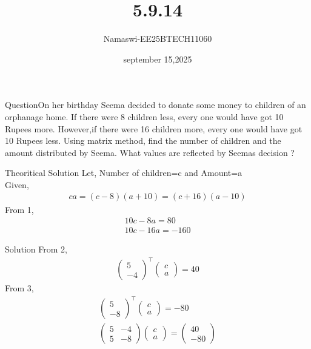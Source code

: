 \documentclass{beamer}
\begin{document}
\title 
{5.9.14}
\date{september 15,2025}


\author 
{Namaswi-EE25BTECH11060}
\frame{\titlepage}
\begin{frame}{Question}On her birthday Seema decided to donate some money to children of an orphanage home. If there were 8 children less, every one would have got  10 Rupees more. However,if there were 16 children more, every one would have got  10 Rupees less. Using matrix method, find the number of children and the amount distributed by Seema. What values are reflected by Seemas decision ?
\end{frame}
\begin{frame}{Theoritical Solution}
    Let, Number of children=c and Amount=a\\
Given,\\
\begin{align}
   ca=(c-8)(a+10)=(c+16)(a-10) 
\end{align}
From 1,
\begin{align}
    10c-8a=80\\
    10c-16a=-160
\end{align}
\end{frame}
\begin{frame}{Solution}
   From 2,
\begin{align}
    \begin{pmatrix}
        5 \\ -4
    \end{pmatrix}^\top \begin{pmatrix}
        c \\ a
    \end{pmatrix}=40
    \end{align}
    From 3,
\begin{align}
    \begin{pmatrix}
     5  \\ -8   
    \end{pmatrix}^\top \begin{pmatrix}
        c \\ a
    \end{pmatrix}=-80\\
    \begin{pmatrix}
        5 & -4 \\
        5 & -8
    \end{pmatrix}\begin{pmatrix}
        c \\ a
    \end{pmatrix}=\begin{pmatrix}
        40 \\ -80
    \end{pmatrix}
\end{align} 
\end{frame}
\end{document}

